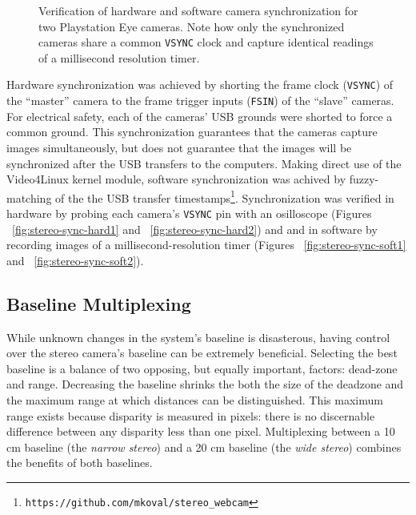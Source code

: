 \documentclass[11pt,twocolumn]{article}
\begin{document}
\begin{figure*}
	\centering
	\caption{
		Verification of hardware and software camera synchronization for two
		Playstation Eye cameras. Note how only the synchronized cameras share a
		common \texttt{VSYNC} clock and capture identical readings of a
		millisecond resolution timer.
	}
	\label{fig:stereo-sync}
\end{figure*}

Hardware synchronization was achieved by  shorting the frame clock
(\texttt{VSYNC}) of the ``master'' camera to the frame trigger inputs
(\texttt{FSIN}) of the ``slave'' cameras. For electrical safety, each of the
cameras' USB grounds were shorted to force a common ground. This
synchronization guarantees that the cameras capture images simultaneously, but
does not guarantee that the images will be synchronized after the USB transfers
to the computers. Making direct use of the Video4Linux kernel module, software
synchronization was achived by fuzzy-matching of the the USB transfer
timestamps\footnote{\texttt{https://github.com/mkoval/stereo\_webcam}}.
Synchronization was verified in hardware by probing each camera's
\texttt{VSYNC} pin with an osilloscope (Figures ~\ref{fig:stereo-sync-hard1}
and ~\ref{fig:stereo-sync-hard2}) and and in software by recording images of a
millisecond-resolution timer (Figures ~\ref{fig:stereo-sync-soft1} and
~\ref{fig:stereo-sync-soft2}).

\subsection{Baseline Multiplexing}
\label{sec:stereo-mux}
While unknown changes in the system's baseline is disasterous, having control
over the stereo camera's baseline can be extremely beneficial. Selecting the
best baseline is a balance of two opposing, but equally important, factors:
dead-zone and range. Decreasing the baseline shrinks the both the size of the
deadzone and the maximum range at which distances can be distinguished. This
maximum range exists because disparity is measured in pixels: there is no
discernable difference between any disparity less than one pixel. Multiplexing
between a 10 cm baseline (the \textit{narrow stereo}) and a 20 cm baseline (the
\textit{wide stereo}) combines the benefits of both baselines.
\end{document}
